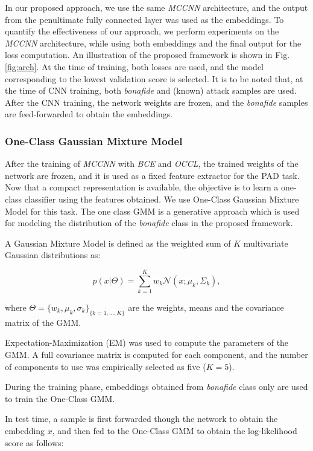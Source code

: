 \documentclass[journal]{IEEEtran}
\begin{document}
In our proposed approach, we use the same \textit{MCCNN} architecture, and the output from the penultimate fully connected layer was used as the embeddings. To quantify the effectiveness of our approach, we perform experiments on the \textit{MCCNN} architecture, while using both embeddings and the final output for the loss computation. An illustration of the proposed framework is shown in Fig. \ref{fig:arch}. At the time of training, both losses are used, and the model corresponding to the lowest validation score is selected. It is to be noted that, at the time of CNN training, both \textit{bonafide} and (known) attack samples are used.  After the CNN training, the network weights are frozen, and the \textit{bonafide} samples are feed-forwarded to obtain the embeddings.
\subsubsection{One-Class Gaussian Mixture Model}

After the training of \textit{MCCNN} with \textit{BCE} and \textit{OCCL}, the trained weights of the network are frozen, and it is used as a fixed feature extractor for the PAD task. Now that a compact representation is available, the objective is to learn a one-class classifier using the features obtained. We use  One-Class Gaussian Mixture Model for this task. The one class GMM is a generative approach which is used for modeling the distribution of the \textit{bonafide} class in the proposed framework.

A Gaussian Mixture Model is defined as the weighted sum of $K$ multivariate Gaussian distributions as:

\begin{equation}
\label{eq:gmm}
p(x|\Theta) = \sum_{k=1}^K w_k \mathcal{N}(x; \mu_k, \Sigma_k),
\end{equation}

where $\Theta = \{ w_k, \mu_k, \sigma_k \}_{ \{ k = 1,\dots,K \} }$ are the weights, means and the covariance matrix of the GMM.

Expectation-Maximization (EM) \cite{Dempster77maximumlikelihood} was used to compute the parameters of the GMM. A full covariance matrix is computed for each component, and the number of components to use was empirically selected as five ($K=5$).

During the training phase, embeddings obtained from \textit{bonafide} class only are used to train the One-Class GMM.

In test time, a sample is first forwarded though the network to obtain the embedding $x$, and then fed to the One-Class GMM to obtain the log-likelihood score as follows:
\end{document}
